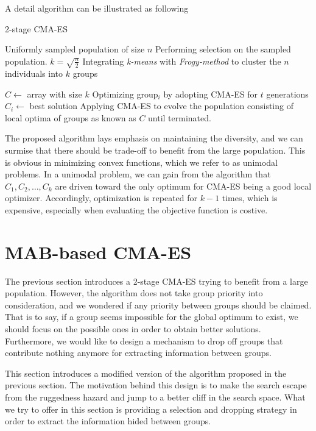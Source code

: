 A detail algorithm can be illustrated as following\\
\begin{algorithm}[H]{
		\caption{2-stage CMA-ES}
    Uniformly sampled population of size $n$\;
    Performing selection on the sampled population.
    $k = \sqrt{\frac{n}{2}}$\;
    Integrating \emph{k-means} with \emph{Frogy-method} to cluster the
    $n$ individuals into $k$ groups\;

		$C\leftarrow$ array with size $k$\;
    {
      Optimizing group$_i$ by adopting CMA-ES for $t$ generations\;
			$C_i\leftarrow$ best solution\;
      Applying CMA-ES to evolve the population consisting of local
      optima of groups as known as $C$ until terminated.\;
    }
}
\end{algorithm}

The proposed algorithm lays emphasis on maintaining the diversity, and
we can surmise that there should be trade-off to benefit from the large
population.
This is obvious in minimizing convex functions, which we refer to as
unimodal problems.
In a unimodal problem, we can gain from the algorithm that $C_1, C_2,
\ldots, C_k$ are driven toward the only optimum for CMA-ES being a good
local optimizer.
Accordingly, optimization is repeated for $k-1$ times, which is
expensive, especially when evaluating the objective function is costive.


\section{MAB-based CMA-ES} \label{MAB-based}

The previous section introduces a 2-stage CMA-ES trying to benefit from
a large population.
However, the algorithm does not take group priority into consideration,
and we wondered if any priority between groups should be claimed.
That is to say, if a group seems impossible for the global optimum to
exist, we should focus on the possible ones in order to obtain better
solutions.
Furthermore, we would like to design a mechanism to drop off groups that
contribute nothing anymore for extracting information between groups.

This section introduces a modified version of the algorithm
proposed in the previous section.
The motivation behind this design is to make the search escape from the
ruggedness hazard and jump to a better cliff in the search space.
What we try to offer in this section is providing a selection and
dropping strategy in order to extract the information hided between
groups.

